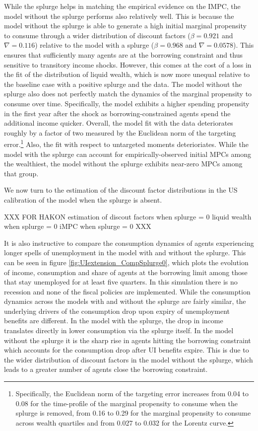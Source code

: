 \documentclass[\econtexRoot/HAFiscal]{subfiles}
\begin{document}
While the splurge helps in matching the empirical evidence on the IMPC, the model without the splurge performs also relatively well. This is because the model without the splurge is able to generate a high initial marginal propensity to consume through a wider distribution of discount factors ($\beta = 0.921$ and $\nabla=0.116$) relative to the model with a splurge ($\beta = 0.968$ and $\nabla=0.0578$). This ensures that sufficiently many agents are at the borrowing constraint and thus sensitive to transitory income shocks. However, this comes at the cost of a loss in the fit of the distribution of liquid wealth, which is now more unequal relative to the baseline case with a positive splurge and the data. The model without the splurge also does not perfectly match the dynamics of the marginal propensity to consume over time. Specifically, the model exhibits a higher spending propensity in the first year after the shock as borrowing-constrained agents spend the additional income quicker. Overall, the model fit with the data deteriorates roughly by a factor of two measured by the Euclidean norm of the targeting error.\footnote{Specifically, the Euclidean norm of the targeting error increases from 0.04 to 0.08 for the time-profile of the marginal propensity to consume when the splurge is removed, from 0.16 to 0.29 for the marginal propensity to consume across wealth quartiles and from 0.027 to 0.032 for the Lorentz curve.} Also, the fit with respect to untargeted moments deterioriates. While the model with the splurge can account for empirically-observed initial MPCs among the wealthiest, the model without the splurge exhibits near-zero MPCs among that group. 

We now turn to the estimation of the discount factor distributions in the US calibration of the model when the splurge is absent. 

XXX
FOR HAKON
estimation of discout factors when splurge = 0
liquid wealth when splurge = 0
iMPC when splurge = 0
XXX



It is also instructive to compare the consumption dynamics of agents experiencing longer spells of unemployment in the model with and without the splurge. This can be seen in figure \ref{fig:UIextension_CompSplurge0}, which plots the evolution of income, consumption and share of agents at the borrowing limit among those that stay unemployed for at least five quarters. In this simulation there is no recession and none of the fiscal policies are implemented. While the consumption dynamics across the models with and without the splurge are fairly similar, the underlying drivers of the consumption drop upon expiry of unemployment benefits are different. In the model with the splurge, the drop in income translates directly in lower consumption via the splurge itself. In the model without the splurge it is the sharp rise in agents hitting the borrowing constraint which accounts for the consumption drop after UI benefits expire. This is due to the wider distribution of discount factors in the model without the splurge, which leads to a greater number of agents close the borrowing constraint. 
\end{document}

